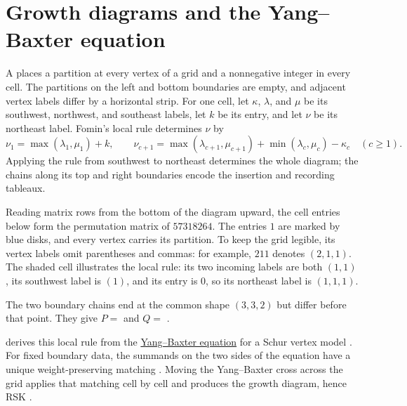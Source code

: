 \section[rskYangBaxter]{Growth diagrams and the Yang--Baxter equation}

A  places a partition at every vertex of a grid and a
nonnegative integer in every cell.  The partitions on the left and bottom
boundaries are empty, and adjacent vertex labels differ by a horizontal strip.
For one cell, let $\kappa$, $\lambda$, and $\mu$ be its southwest, northwest,
and southeast labels, let $k$ be its entry, and let $\nu$ be its northeast
label.  Fomin's local rule \cite[Eq.~(1.1)]{Petrov2026x} determines $\nu$ by
\[
 \nu_1=\max(\lambda_1,\mu_1)+k,
 \qquad
 \nu_{c+1}=\max(\lambda_{c+1},\mu_{c+1})
 +\min(\lambda_c,\mu_c)-\kappa_c
 \quad(c\geq 1).
\]
Applying the rule from southwest to northeast determines the whole diagram;
the chains along its top and right boundaries encode the insertion and
recording tableaux.

\begin{example*}
Reading matrix rows from the bottom of the diagram upward, the cell entries
below form the permutation matrix of $57318264$.  The entries $1$ are marked
by blue disks, and every vertex carries its partition.  To keep the grid
legible, its vertex labels omit parentheses and commas: for example, $211$
denotes $(2,1,1)$.  The shaded cell illustrates the local rule: its two
incoming labels are both $(1,1)$, its southwest label is $(1)$, and its entry
is $0$, so its northeast label is $(1,1,1)$.

\begin{figure}
\end{figure}

The two boundary chains end at the common shape $(3,3,2)$ but differ before
that point.  They give
$P=$ 
and
$Q=$ .
\end{example*}

 derives this local rule from the
\hyperref[latticeModelYangBaxter]{Yang--Baxter equation} for a Schur vertex model
\cite{Petrov2026x}.  For fixed boundary data, the summands on the two sides of
the equation have a unique weight-preserving matching
\cite[Lem.~3.2]{Petrov2026x}.  Moving the Yang--Baxter cross across the grid
applies that matching cell by cell and produces the growth diagram, hence RSK
\cite[Prop.~3.5]{Petrov2026x}.

